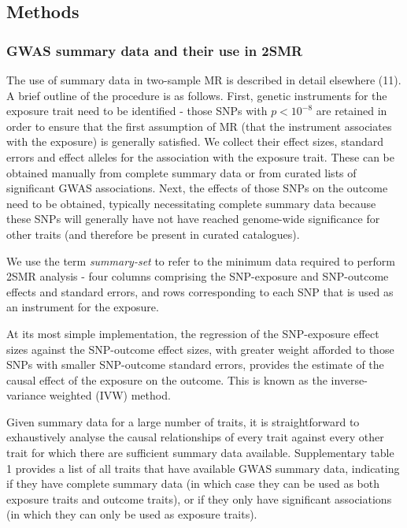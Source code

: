 \documentclass[]{article}
\begin{document}
\subsection{Methods}\label{methods}

\subsubsection{GWAS summary data and their use in
2SMR}\label{gwas-summary-data-and-their-use-in-2smr}

The use of summary data in two-sample MR is described in detail
elsewhere (11). A brief outline of the procedure is as follows. First,
genetic instruments for the exposure trait need to be identified - those
SNPs with \(p < 10^{-8}\) are retained in order to ensure that the first
assumption of MR (that the instrument associates with the exposure) is
generally satisfied. We collect their effect sizes, standard errors and
effect alleles for the association with the exposure trait. These can be
obtained manually from complete summary data or from curated lists of
significant GWAS associations. Next, the effects of those SNPs on the
outcome need to be obtained, typically necessitating complete summary
data because these SNPs will generally have not have reached genome-wide
significance for other traits (and therefore be present in curated
catalogues).

We use the term \emph{summary-set} to refer to the minimum data required
to perform 2SMR analysis - four columns comprising the SNP-exposure and
SNP-outcome effects and standard errors, and rows corresponding to each
SNP that is used as an instrument for the exposure.

At its most simple implementation, the regression of the SNP-exposure
effect sizes against the SNP-outcome effect sizes, with greater weight
afforded to those SNPs with smaller SNP-outcome standard errors,
provides the estimate of the causal effect of the exposure on the
outcome. This is known as the inverse-variance weighted (IVW) method.

Given summary data for a large number of traits, it is straightforward
to exhaustively analyse the causal relationships of every trait against
every other trait for which there are sufficient summary data available.
Supplementary table 1 provides a list of all traits that have available
GWAS summary data, indicating if they have complete summary data (in
which case they can be used as both exposure traits and outcome traits),
or if they only have significant associations (in which they can only be
used as exposure traits).
\end{document}
